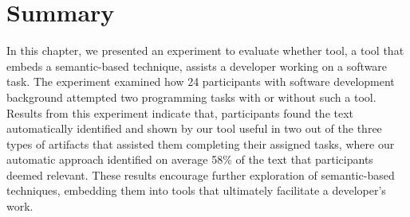 \section{Summary}
\label{cp6:summary}



In this chapter, we presented an experiment to evaluate whether \acs{tool},
 a tool that embeds a semantic-based technique, assists a developer working on a software task. 
The experiment examined how 24 participants with software development background attempted 
two programming tasks with or without such a tool. 
Results from this experiment indicate that, 
participants found the text automatically identified and shown by our tool useful in two 
out of the three types of artifacts that assisted them completing their assigned tasks,
where our automatic approach identified on average 58\% of the text that participants deemed relevant. 
These results encourage further exploration of semantic-based techniques, 
embedding them into tools that ultimately facilitate a developer's work.